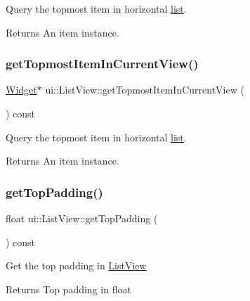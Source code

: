 Query the topmost item in horizontal \hyperlink{protocollist-p}{list}. 

\begin{DoxyReturn}{Returns}
An item instance. 
\end{DoxyReturn}
\mbox{\label{classui_1_1ListView_ac80f26ac523ac2335d136baaf4eb5fab}} 
\subsubsection{\texorpdfstring{get\+Topmost\+Item\+In\+Current\+View()}{getTopmostItemInCurrentView()}\hspace{0.1cm}{\footnotesize\ttfamily [2/2]}}
{\footnotesize\ttfamily \hyperlink{classui_1_1Widget}{Widget}$\ast$ ui\+::\+List\+View\+::get\+Topmost\+Item\+In\+Current\+View (\begin{DoxyParamCaption}{ }\end{DoxyParamCaption}) const}



Query the topmost item in horizontal \hyperlink{protocollist-p}{list}. 

\begin{DoxyReturn}{Returns}
An item instance. 
\end{DoxyReturn}
\mbox{\label{classui_1_1ListView_afa41ccf9bd1b8301f33745756424625d}} 
\subsubsection{\texorpdfstring{get\+Top\+Padding()}{getTopPadding()}}
{\footnotesize\ttfamily float ui\+::\+List\+View\+::get\+Top\+Padding (\begin{DoxyParamCaption}{ }\end{DoxyParamCaption}) const}

Get the top padding in \hyperlink{classui_1_1ListView}{List\+View} \begin{DoxyReturn}{Returns}
Top padding in float 
\end{DoxyReturn}
\mbox{\label{classui_1_1ListView_ab6e5f75b2cdf36871d994fccd55c75ae}} 
